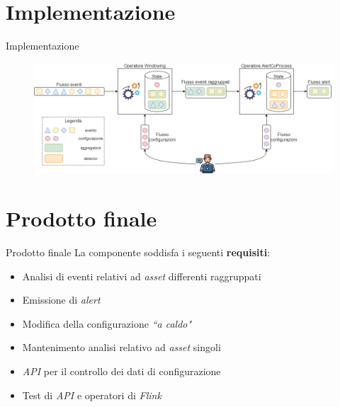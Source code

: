 \documentclass{beamer}
\begin{document}
	\section{Implementazione}

	\begin{frame}{Implementazione}
		\begin{figure}[!h]
    		 \centering
    		\includegraphics[width=11.5cm]{../immagini/slide/implementation.png}
		\end{figure}
	\end{frame}
	
	
	
	\section{Prodotto finale}

	\begin{frame}{Prodotto finale}
		La componente soddisfa i seguenti \textbf{requisiti}:
		\vspace{.2em}
		\begin{itemize}
			\item Analisi di eventi relativi ad \textit{asset} differenti raggruppati \vspace{.5em}
			\item Emissione di \textit{alert} \vspace{.5em}
			\item Modifica della configurazione \textit{``a caldo"} \vspace{.5em}
			\item Mantenimento analisi relativo ad \textit{asset} singoli \vspace{.5em}
			\item \textit{API} per il controllo dei dati di configurazione \vspace{.5em}
			\item Test di \textit{API} e operatori di \textit{Flink} \vspace{.5em}
		\end{itemize}
	\end{frame}
	
\end{document}
